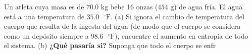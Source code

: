 \item Un atleta cuya masa es de $70.0\text{ kg}$ bebe 16 onzas ($454\text{ g}$) de agua fría. El agua está a una temperatura de $35.0\text{ }^\circ\text{F}$. 
(a) Si ignora el cambio de temperatura del cuerpo que resulta de la ingesta del agua (de modo que el cuerpo se considera como un depósito siempre a $98.6\text{ }^\circ\text{F}$), encuentre el aumento en entropía de todo el sistema. 
(b) \textbf{¿Qué pasaría si?} Suponga que todo el cuerpo se enfr %
